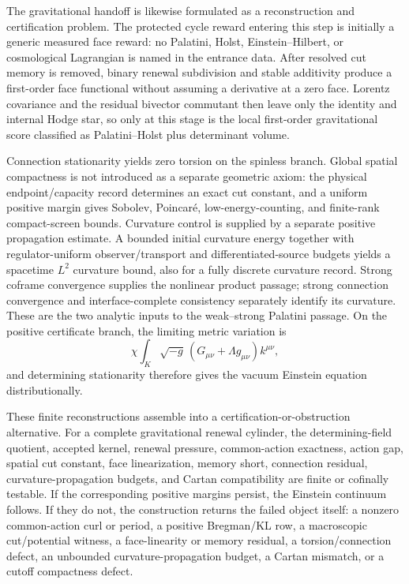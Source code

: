 \documentclass[11pt]{article}
\theoremstyle{definition}
\theoremstyle{remark}
\begin{document}
The gravitational handoff is likewise formulated as a reconstruction and
certification problem.  The protected cycle reward entering this step is
initially a generic measured face reward: no Palatini, Holst,
Einstein--Hilbert, or cosmological Lagrangian is named in the entrance data.
After resolved cut memory is removed, binary renewal subdivision and stable
additivity produce a first-order face functional without assuming a derivative
at a zero face.  Lorentz covariance and the residual bivector commutant then
leave only the identity and internal Hodge star, so only at this stage is the
local first-order gravitational score classified as Palatini--Holst plus
determinant volume.

Connection stationarity yields zero torsion on the spinless branch.  Global
spatial compactness is not introduced as a separate geometric axiom: the
physical endpoint/capacity record determines an exact cut constant, and a
uniform positive margin gives Sobolev, Poincar\'e, low-energy-counting, and
finite-rank compact-screen bounds.  Curvature control is supplied by a separate
positive propagation estimate.  A bounded initial curvature energy together
with regulator-uniform observer/transport and differentiated-source budgets
yields a spacetime $L^2$ curvature bound, also for a fully discrete curvature
record.  Strong coframe convergence supplies the nonlinear product passage;
strong connection convergence and interface-complete consistency separately
identify its curvature.  These are the two analytic inputs to the
weak--strong Palatini passage.  On the positive certificate branch,
the limiting metric variation is
\begin{equation}
\chi\int_K\sqrt{-g}\,
(G_{\mu\nu}+\Lambda g_{\mu\nu})k^{\mu\nu},
\end{equation}
and determining stationarity therefore gives the vacuum Einstein equation
distributionally.

These finite reconstructions assemble into a certification-or-obstruction
alternative.  For a complete gravitational renewal cylinder, the
determining-field quotient, accepted kernel, renewal pressure, common-action
exactness, action gap, spatial cut constant, face linearization, memory short,
connection residual, curvature-propagation budgets, and Cartan compatibility
are finite or cofinally testable.  If the corresponding positive margins
persist, the Einstein continuum follows.  If they do not, the construction
returns the failed object itself: a nonzero common-action curl or period, a
positive Bregman/KL row, a macroscopic cut/potential witness, a
face-linearity or memory residual, a torsion/connection defect, an unbounded
curvature-propagation budget, a Cartan mismatch, or a cutoff compactness
defect.
\end{document}
